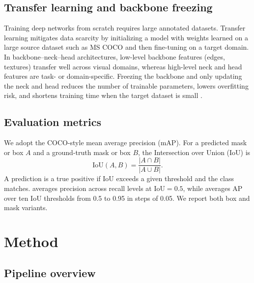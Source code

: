 \documentclass[11pt,a4paper]{article}
\begin{document}
\subsection{Transfer learning and backbone freezing}

Training deep networks from scratch requires large annotated datasets. Transfer learning mitigates data scarcity by initializing a model with weights learned on a large source dataset such as MS COCO \cite{Lin2014COCO} and then fine-tuning on a target domain. In backbone--neck--head architectures, low-level backbone features (edges, textures) transfer well across visual domains, whereas high-level neck and head features are task- or domain-specific. Freezing the backbone and only updating the neck and head reduces the number of trainable parameters, lowers overfitting risk, and shortens training time when the target dataset is small \cite{Jocher2023Ultralytics}.

\subsection{Evaluation metrics}\label{sec:metrics}

We adopt the COCO-style mean average precision (mAP). For a predicted mask or box $A$ and a ground-truth mask or box $B$, the Intersection over Union (IoU) is
\begin{equation}\label{eq:iou}
    \text{IoU}(A,B) = \frac{|A \cap B|}{|A \cup B|}.
\end{equation}
A prediction is a true positive if IoU exceeds a given threshold and the class matches.  averages precision across recall levels at IoU$=0.5$, while  averages AP over ten IoU thresholds from 0.5 to 0.95 in steps of 0.05. We report both box and mask variants.

\section{Method}\label{sec:method}

\subsection{Pipeline overview}
\end{document}
